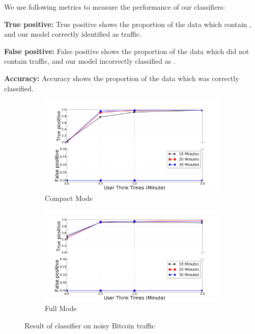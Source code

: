 We use following metrics to measure the performance of our classifiers:
\begin{compactitem}
\item \textbf{True positive:} True positive shows the proportion of the data which contain \bc, and our model correctly identified as \bc traffic.
\item \textbf{False positive:} False positive shows the proportion of the data which did  not contain \bc traffic, and our model incorrectly classified as \bc.
\item \textbf{Accuracy:} Accuracy shows the proportion of the data which was correctly classified.
\end{compactitem}
\begin{figure}

\begin{subfigure}{0.48\linewidth}
\centering
\includegraphics[width=\linewidth]{image/jan25/cmp_sizeHist.pdf}
\caption{Compact Mode}
\label{fig:vanilla_sizeTor}
\end{subfigure}
\begin{subfigure}{0.48\linewidth}
\centering
\includegraphics[width=\linewidth]{image/jan25/full_sizeHist.pdf}
\caption{Full Mode}
\label{fig:vanilla_d2u}
\end{subfigure}
\caption{Result of  classifier on noisy Bitcoin traffic}
\label{fig:sizeHist_non}
\end{figure} 
